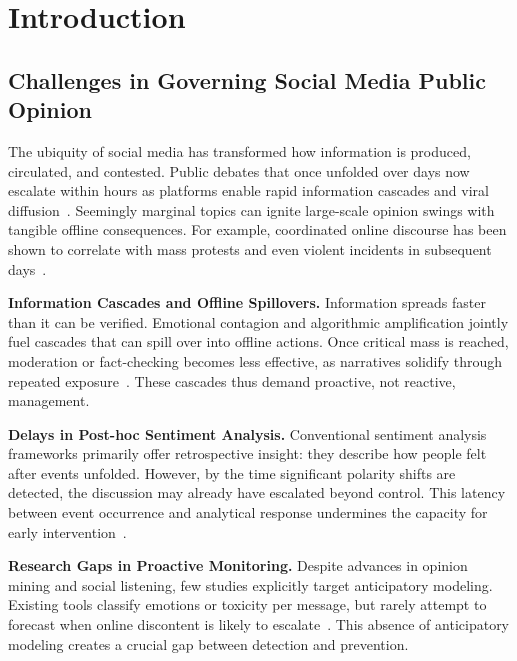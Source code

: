 \documentclass[11pt,a4paper]{article}
\begin{document}
\newpage

\section{Introduction}

\subsection{Challenges in Governing Social Media Public Opinion}

The ubiquity of social media has transformed how information is produced, circulated, and contested. Public debates that once unfolded over days now escalate within hours as platforms enable rapid information cascades and viral diffusion~\cite{Vosoughi2018}. Seemingly marginal topics can ignite large-scale opinion swings with tangible offline consequences. For example, coordinated online discourse has been shown to correlate with mass protests and even violent incidents in subsequent days~\cite{Steinert2015,Arcila2024}. 

\textbf{Information Cascades and Offline Spillovers.} Information spreads faster than it can be verified. Emotional contagion and algorithmic amplification jointly fuel cascades that can spill over into offline actions. Once critical mass is reached, moderation or fact-checking becomes less effective, as narratives solidify through repeated exposure~\cite{Vosoughi2018}. These cascades thus demand proactive, not reactive, management.

\textbf{Delays in Post-hoc Sentiment Analysis.} Conventional sentiment analysis frameworks primarily offer retrospective insight: they describe how people felt after events unfolded. However, by the time significant polarity shifts are detected, the discussion may already have escalated beyond control. This latency between event occurrence and analytical response undermines the capacity for early intervention~\cite{Wang2020}.

\textbf{Research Gaps in Proactive Monitoring.} Despite advances in opinion mining and social listening, few studies explicitly target anticipatory modeling. Existing tools classify emotions or toxicity per message, but rarely attempt to forecast when online discontent is likely to escalate~\cite{Wang2020}. This absence of anticipatory modeling creates a crucial gap between detection and prevention.
\end{document}
